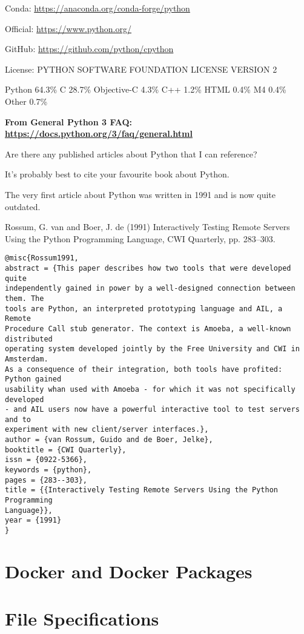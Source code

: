 \documentclass[]{article}
\begin{document}
Conda: \url{https://anaconda.org/conda-forge/python}

Official: \url{https://www.python.org/}

GitHub: \url{https://github.com/python/cpython}

License: PYTHON SOFTWARE FOUNDATION LICENSE VERSION 2

Python 64.3\% C 28.7\% Objective-C 4.3\% C++ 1.2\% HTML 0.4\% M4 0.4\% Other 0.7\% 

\textbf{From General Python 3 FAQ: \url{https://docs.python.org/3/faq/general.html}}

Are there any published articles about Python that I can reference?

It's probably best to cite your favourite book about Python.

The very first article about Python was written in 1991 and is now quite outdated.

Rossum, G. van and Boer, J. de (1991) Interactively Testing Remote Servers Using the Python Programming Language, CWI Quarterly, pp. 283–303.

\begin{verbatim}
@misc{Rossum1991,
abstract = {This paper describes how two tools that were developed quite 
independently gained in power by a well-designed connection between them. The 
tools are Python, an interpreted prototyping language and AIL, a Remote
Procedure Call stub generator. The context is Amoeba, a well-known distributed
operating system developed jointly by the Free University and CWI in Amsterdam.
As a consequence of their integration, both tools have profited: Python gained
usability whan used with Amoeba - for which it was not specifically developed
- and AIL users now have a powerful interactive tool to test servers and to
experiment with new client/server interfaces.},
author = {van Rossum, Guido and de Boer, Jelke},
booktitle = {CWI Quarterly},
issn = {0922-5366},
keywords = {python},
pages = {283--303},
title = {{Interactively Testing Remote Servers Using the Python Programming
Language}},
year = {1991}
}
\end{verbatim}

\part{Docker and Docker Packages}



\part{File Specifications}
\end{document}
